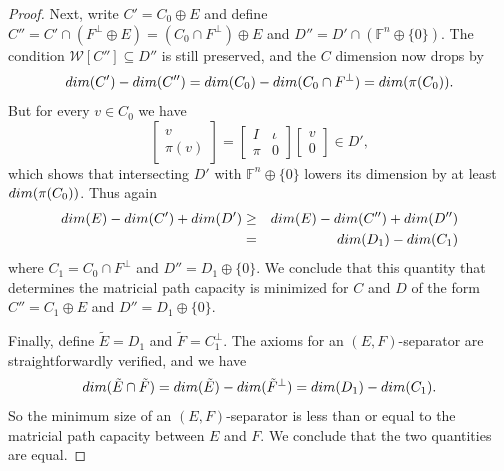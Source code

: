 \documentclass[10pt,a4paper]{amsart}
\begin{document}
\begin{proof}
Next, write $C' = C_0 \oplus E$ and define $C'' = C' \cap (F^\perp \oplus E) = (C_0 \cap F^\perp) \oplus E$ and $D'' = D' \cap (\mathbb{F}^n \oplus \{0\})$. The condition $\mathcal{W}[C''] \subseteq D''$ is still preserved, and the $C$ dimension now drops by $${\rm dim}(C') - {\rm dim}(C'') = {\rm dim}(C_0) - {\rm dim}(C_0 \cap F^\perp) = {\rm dim}(\pi(C_0)).$$ But for every $v \in C_0$ we have $$\left[\begin{matrix}v\\ \pi(v)\end{matrix}\right] = \left[\begin{matrix}I&\iota\\ \pi&0\end{matrix}\right]\left[\begin{matrix}v\\ 0\end{matrix}\right] \in D',$$ which shows that intersecting $D'$ with $\mathbb{F}^n \oplus \{0\}$ lowers its dimension by at least ${\rm dim}(\pi(C_0))$. Thus again \begin{eqnarray*}{\rm dim}(E) - {\rm dim}(C') + {\rm dim}(D') &\geq& {\rm dim}(E) - {\rm dim}(C'') + {\rm dim}(D'')\\
&=& {\rm dim}(D_1) - {\rm dim}(C_1)\end{eqnarray*} where $C_1 = C_0 \cap F^\perp$ and $D'' = D_1 \oplus \{0\}$. We conclude that this quantity that determines the matricial path capacity is minimized for $C$ and $D$ of the form $C'' = C_1 \oplus E$ and $D'' = D_1 \oplus \{0\}$.

Finally, define $\tilde{E} = D_1$ and $\tilde{F} = C_1^\perp$. The axioms for an $(E,F)$-separator are straightforwardly verified, and we have $${\rm dim}(\tilde{E} \cap \tilde{F}) = {\rm dim}(\tilde{E}) - {\rm dim}(\tilde{F}^\perp) = {\rm dim}(D_1) - {\rm dim}(C_1).$$ So the minimum size of an $(E,F)$-separator is less than or equal to the matricial path capacity between $E$ and $F$. We conclude that the two quantities are equal.
\end{proof}
\end{document}
